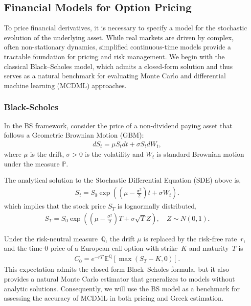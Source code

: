 \subsection{Financial Models for Option Pricing}
\label{sec:financial_models}

To price financial derivatives, it is necessary to specify a model for the stochastic evolution of the underlying asset. While real markets are driven by complex, often non-stationary dynamics, simplified continuous-time models provide a tractable foundation for pricing and risk management. We begin with the classical Black--Scholes model, which admits a closed-form solution and thus serves as a natural benchmark for evaluating Monte Carlo and differential machine learning (MCDML) approaches.

\subsubsection{Black-Scholes} \label{sec:black-scholes}

In the BS framework, consider the price of a non-dividend paying asset that follows a Geometric Brownian Motion (GBM):
\begin{align}
    dS_t = \mu S_t dt + \sigma S_t dW_t, \label{eq:BS_stock}
\end{align}
where $\mu$ is the drift, $\sigma>0$ is the volatility and $W_t$ is standard Brownian motion under the measure $\mathbb{P}$.

The analytical solution to the Stochastic Differential Equation (SDE) above is,
\begin{align*}
    S_t = S_0 \exp\left( \left(\mu - \frac{\sigma^2}{2}\right)t + \sigma W_t \right).
\end{align*}
which implies that the stock price $S_T$ is lognormally distributed, 
\begin{align*}
    S_T = S_0 \exp\left( \left(\mu - \frac{\sigma^2}{2}\right)T + \sigma \sqrt{T} Z \right), \quad Z \sim N(0,1).
\end{align*}

Under the risk-neutral measure~$\mathbb{Q}$, the drift $\mu$ is replaced by the risk-free rate~$r$, and the time-$0$ price of a European call option with strike~$K$ and maturity~$T$ is
\begin{align}
    C_0 = e^{-rT}\,\mathbb{E}^{\mathbb{Q}}\!\left[\max(S_T - K,0)\right].
    \label{eq:bs_price}
\end{align}
This expectation admits the closed-form Black--Scholes formula, but it also provides a natural Monte Carlo estimator that generalizes to models without analytic solutions. Consequently, we will use the BS model as a benchmark for assessing the accuracy of MCDML in both pricing and Greek estimation.

